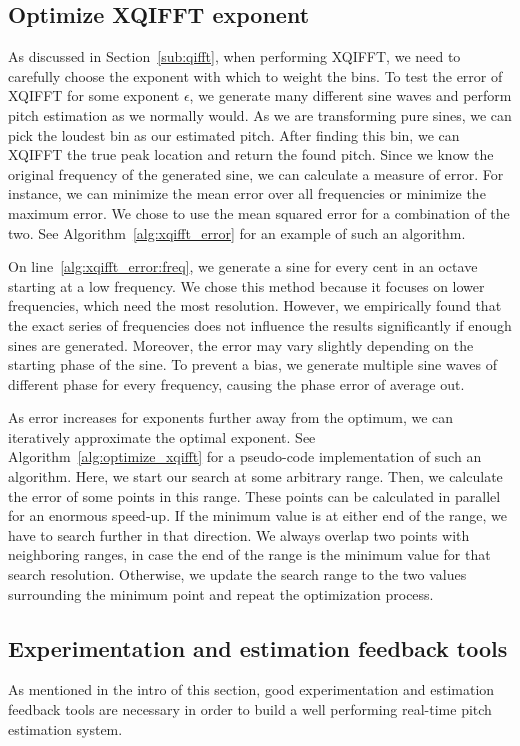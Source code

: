 \documentclass[a4paper,10pt,twocolumn]{article}
\begin{document}
\subsection{Optimize XQIFFT exponent}  \label{sub:opt_xqfft}
As discussed in Section~\ref{sub:qifft}, when performing XQIFFT, we need to carefully choose the exponent with which to weight the bins. To test the error of XQIFFT for some exponent $\epsilon$, we generate many different sine waves and perform pitch estimation as we normally would. As we are transforming pure sines, we can pick the loudest bin as our estimated pitch. After finding this bin, we can XQIFFT the true peak location and return the found pitch. Since we know the original frequency of the generated sine, we can calculate a measure of error. For instance, we can minimize the mean error over all frequencies or minimize the maximum error. We chose to use the mean squared error for a combination of the two. See Algorithm~\ref{alg:xqifft_error} for an example of such an algorithm.

On line~\ref{alg:xqifft_error:freq}, we generate a sine for every cent in an octave starting at a low frequency. We chose this method because it focuses on lower frequencies, which need the most resolution. However, we empirically found that the exact series of frequencies does not influence the results significantly if enough sines are generated. Moreover, the error may vary slightly depending on the starting phase of the sine. To prevent a bias, we generate multiple sine waves of different phase for every frequency, causing the phase error of average out.



As error increases for exponents further away from the optimum, we can iteratively approximate the optimal exponent. See Algorithm~\ref{alg:optimize_xqifft} for a pseudo-code implementation of such an algorithm. Here, we start our search at some arbitrary range. Then, we calculate the error of some points in this range. These points can be calculated in parallel for an enormous speed-up. If the minimum value is at either end of the range, we have to search further in that direction. We always overlap two points with neighboring ranges, in case the end of the range is the minimum value for that search resolution. Otherwise, we update the search range to the two values surrounding the minimum point and repeat the optimization process.


\subsection{Experimentation and estimation feedback tools}  \label{sub:tools}
As mentioned in the intro of this section, good experimentation and estimation feedback tools are necessary in order to build a well performing real-time pitch estimation system.
\end{document}
